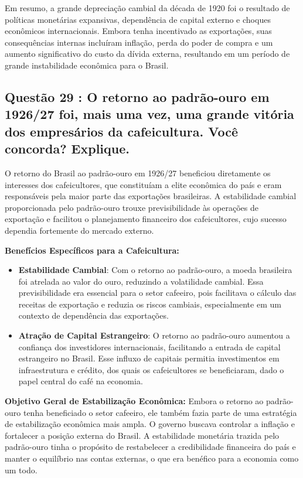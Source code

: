 \documentclass[a4paper,12pt]{article}[abntex2]
\begin{document}
Em resumo, a grande depreciação cambial da década de 1920 foi o resultado de políticas monetárias expansivas, dependência de capital externo e choques econômicos internacionais. Embora tenha incentivado as exportações, suas consequências internas incluíram inflação, perda do poder de compra e um aumento significativo do custo da dívida externa, resultando em um período de grande instabilidade econômica para o Brasil.

\subsection{\textbf{Questão 29 : O retorno ao padrão-ouro em 1926/27 foi, mais uma vez, uma grande vitória dos empresários da cafeicultura. Você concorda? Explique.}}

O retorno do Brasil ao padrão-ouro em 1926/27 beneficiou diretamente os interesses dos cafeicultores, que constituíam a elite econômica do país e eram responsáveis pela maior parte das exportações brasileiras. A estabilidade cambial proporcionada pelo padrão-ouro trouxe previsibilidade às operações de exportação e facilitou o planejamento financeiro dos cafeicultores, cujo sucesso dependia fortemente do mercado externo.

\textbf{Benefícios Específicos para a Cafeicultura:}
\begin{itemize}
    \item \textbf{Estabilidade Cambial}: Com o retorno ao padrão-ouro, a moeda brasileira foi atrelada ao valor do ouro, reduzindo a volatilidade cambial. Essa previsibilidade era essencial para o setor cafeeiro, pois facilitava o cálculo das receitas de exportação e reduzia os riscos cambiais, especialmente em um contexto de dependência das exportações.
    \item \textbf{Atração de Capital Estrangeiro}: O retorno ao padrão-ouro aumentou a confiança dos investidores internacionais, facilitando a entrada de capital estrangeiro no Brasil. Esse influxo de capitais permitia investimentos em infraestrutura e crédito, dos quais os cafeicultores se beneficiaram, dado o papel central do café na economia.
\end{itemize}

\textbf{Objetivo Geral de Estabilização Econômica:}
Embora o retorno ao padrão-ouro tenha beneficiado o setor cafeeiro, ele também fazia parte de uma estratégia de estabilização econômica mais ampla. O governo buscava controlar a inflação e fortalecer a posição externa do Brasil. A estabilidade monetária trazida pelo padrão-ouro tinha o propósito de restabelecer a credibilidade financeira do país e manter o equilíbrio nas contas externas, o que era benéfico para a economia como um todo.
\end{document}
